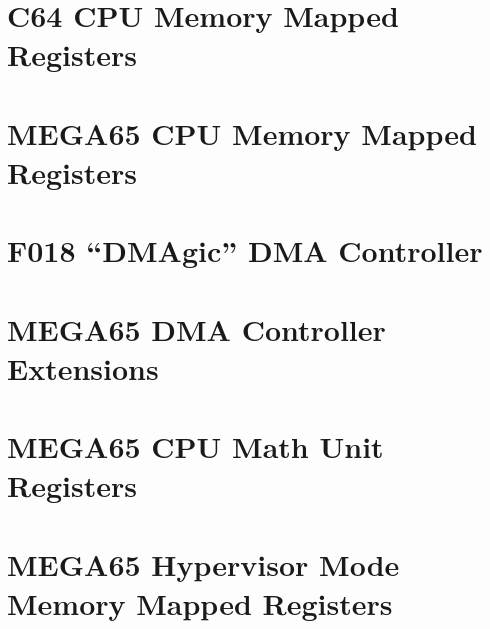 \section{C64 CPU Memory Mapped Registers}



\section{MEGA65 CPU Memory Mapped Registers}



\section{F018 ``DMAgic'' DMA Controller}



\section{MEGA65 DMA Controller Extensions}



\section{MEGA65 CPU Math Unit Registers}



\section{MEGA65 Hypervisor Mode Memory Mapped Registers}


